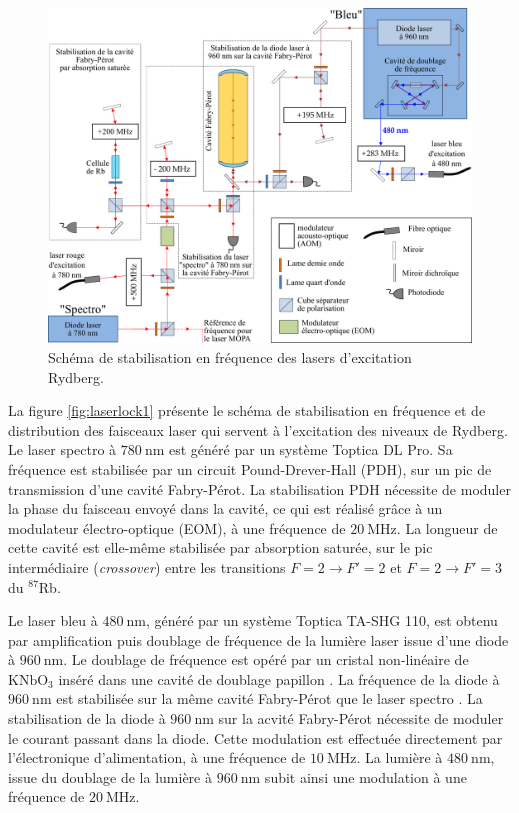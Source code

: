 \documentclass[11pt,a4paper,twoside]{book}
\newcommand{\Rb}[1]{${}^{#1}$Rb}
\begin{document}
\begin{figure}[h]
\centering
\includegraphics[width=\linewidth]{figures/apx/stabil_laser_1}
\caption[Schéma de stabilisation en fréquence des lasers d'excitation Rydberg]
{
Schéma de stabilisation en fréquence des lasers d'excitation Rydberg.
}
\label{fig:laserlock1}
\end{figure}

\noindent La figure \eqref{fig:laserlock1} présente le schéma de stabilisation en fréquence et de distribution des faisceaux laser qui servent à l'excitation des niveaux de Rydberg.
Le laser \og spectro \fg{} à $\SI{780}{\nano\meter}$ est généré par un système Toptica DL Pro.
Sa fréquence est stabilisée par un circuit Pound-Drever-Hall (PDH), sur un pic de transmission d'une cavité Fabry-Pérot.
La stabilisation PDH nécessite de moduler la phase du faisceau envoyé dans la cavité, ce qui est réalisé grâce à un modulateur électro-optique (EOM), à une fréquence de $\SI{20}{\MHz}$.
La longueur de cette cavité est elle-même stabilisée par absorption saturée, sur le pic intermédiaire (\textit{crossover}) entre les transitions $F=2 \rightarrow F'=2$ et $F=2 \rightarrow F'=3$ du \Rb{87}.

Le laser bleu à $\SI{480}{\nano\meter}$, généré par un système Toptica TA-SHG 110, est obtenu par amplification puis doublage de fréquence de la lumière laser issue d'une diode à $\SI{960}{\nano\meter}$. Le doublage de fréquence est opéré par un cristal non-linéaire de $\mathrm{KNbO_3}$ inséré dans une cavité de doublage \og papillon \fg{}. La fréquence de la diode à $\SI{960}{\nano\meter}$ est stabilisée sur la même cavité Fabry-Pérot que le laser \og spectro \fg{}.
La stabilisation de la diode à $\SI{960}{\nano\meter}$ sur la acvité Fabry-Pérot nécessite de moduler le courant passant dans la diode. Cette modulation est effectuée directement par l'électronique d'alimentation, à une fréquence de $\SI{10}{\MHz}$.
La lumière à $\SI{480}{\nano\meter}$, issue du doublage de la lumière à $\SI{960}{\nano\meter}$ subit ainsi une modulation à une fréquence de $\SI{20}{\MHz}$.
\end{document}
